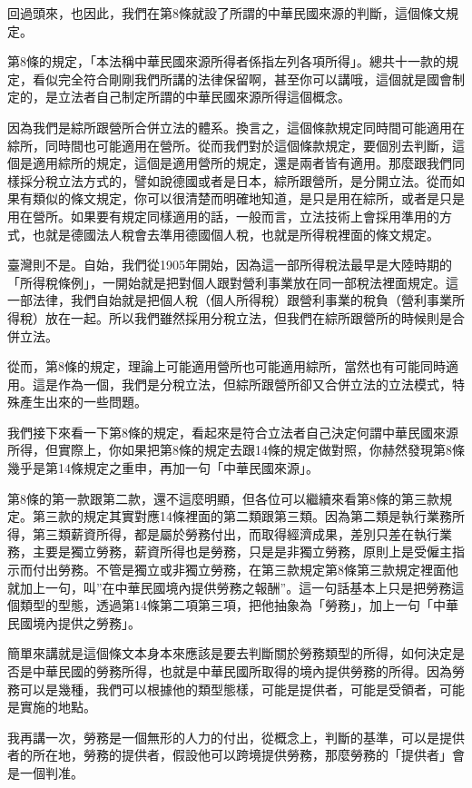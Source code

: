 \documentclass[]{ctexbook}
\begin{document}
回過頭來，也因此，我們在第8條就設了所謂的中華民國來源的判斷，這個條文規定。

第8條的規定，「本法稱中華民國來源所得者係指左列各項所得」。總共十一款的規定，看似完全符合剛剛我們所講的法律保留啊，甚至你可以講哦，這個就是國會制定的，是立法者自己制定所謂的中華民國來源所得這個概念。

因為我們是綜所跟營所合併立法的體系。換言之，這個條款規定同時間可能適用在綜所，同時間也可能適用在營所。從而我們對於這個條款規定，要個別去判斷，這個是適用綜所的規定，這個是適用營所的規定，還是兩者皆有適用。那麼跟我們同樣採分稅立法方式的，譬如說德國或者是日本，綜所跟營所，是分開立法。從而如果有類似的條文規定，你可以很清楚而明確地知道，是只是用在綜所，或者是只是用在營所。如果要有規定同樣適用的話，一般而言，立法技術上會採用準用的方式，也就是德國法人稅會去準用德國個人稅，也就是所得稅裡面的條文規定。

臺灣則不是。自始，我們從1905年開始，因為這一部所得稅法最早是大陸時期的「所得稅條例」，一開始就是把對個人跟對營利事業放在同一部稅法裡面規定。這一部法律，我們自始就是把個人稅（個人所得稅）跟營利事業的稅負（營利事業所得稅）放在一起。所以我們雖然採用分稅立法，但我們在綜所跟營所的時候則是合併立法。

從而，第8條的規定，理論上可能適用營所也可能適用綜所，當然也有可能同時適用。這是作為一個，我們是分稅立法，但綜所跟營所卻又合併立法的立法模式，特殊產生出來的一些問題。

我們接下來看一下第8條的規定，看起來是符合立法者自己決定何謂中華民國來源所得，但實際上，你如果把第8條的規定去跟14條的規定做對照，你赫然發現第8條幾乎是第14條規定之重申，再加一句「中華民國來源」。

第8條的第一款跟第二款，還不這麼明顯，但各位可以繼續來看第8條的第三款規定。第三款的規定其實對應14條裡面的第二類跟第三類。因為第二類是執行業務所得，第三類薪資所得，都是屬於勞務付出，而取得經濟成果，差別只差在執行業務，主要是獨立勞務，薪資所得也是勞務，只是是非獨立勞務，原則上是受僱主指示而付出勞務。不管是獨立或非獨立勞務，在第三款規定第8條第三款規定裡面他就加上一句，叫''在中華民國境內提供勞務之報酬''。這一句話基本上只是把勞務這個類型的型態，透過第14條第二項第三項，把他抽象為「勞務」，加上一句「中華民國境內提供之勞務」。

簡單來講就是這個條文本身本來應該是要去判斷關於勞務類型的所得，如何決定是否是中華民國的勞務所得，也就是中華民國所取得的境內提供勞務的所得。因為勞務可以是幾種，我們可以根據他的類型態樣，可能是提供者，可能是受領者，可能是實施的地點。

我再講一次，勞務是一個無形的人力的付出，從概念上，判斷的基準，可以是提供者的所在地，勞務的提供者，假設他可以跨境提供勞務，那麼勞務的「提供者」會是一個判准。
\end{document}
